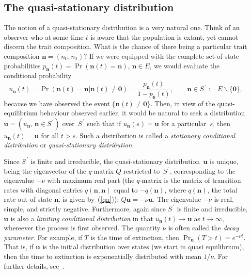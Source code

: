\documentclass[12pt]{article}
\newcommand{\qsd}{quasi-stationary distribution}
\newcommand{\bn}{\boldsymbol{n}}
\newcommand{\bu}{\boldsymbol{u}}
\newcommand{\myprime}{\,\prime}
\newcommand{\bzero}{\boldsymbol{0}}
\begin{document}
\subsection{The {\qsd}}

The notion of a {\qsd} is a very natural one. Think of an observer who
at some time $t$ is aware that the population is extant, yet cannot
discern the trait composition. What is the chance of there being a
particular trait composition $\bn=(n_0,n_1)$? If we were equipped with
the complete set of state probabilities $p_{\bn}(t)=\Pr(\bn(t) =\bn)$,
$\bn\in E$, we would evaluate the conditional probability
$$
u_{\bn}(t)=\Pr(\bn(t) =\bn | \bn(t)\neq \bzero)
= \frac{p_{\bn}(t)}{1-p_{\bzero}(t)},
\qquad
\bn\in S^{\myprime}:=E\backslash \{\bzero\},
$$
because we have observed the event $\{\bn(t) \neq \bzero\}$.
Then, in view of the quasi-equilibrium behaviour observed earlier, it
would be natural to seek a distribution $\bu=(u_{\bn},\, \bn\in
S^{\myprime})$ over~$S^{\myprime}$ such that if $u_{\bn}(s)=\bu$ for a
particular~$s$, then $u_{\bn}(t)=\bu$ for all $t>s$. Such a distribution
is called a {\em stationary conditional distribution\/} or {\em
quasi-stationary distribution\/}.

Since $S^{\myprime}$ is finite and irreducible, the {\qsd}~$\bu$ is
unique, being the eigenvector of the $q$-matrix $Q$ restricted
to~$S^{\myprime}$, corresponding to the eigenvalue $-\nu$ with maximum
real part (the $q$-matrix is the matrix of transition rates with
diagonal entries $q(\bn,\bn)$ equal to $-q(\bn)$, where $q(\bn)$, the
total rate out of state $\bn$, is given by~(\ref{qn})): $Q\bu =-\nu
\bu$. The eigenvalue $-\nu$ is real, simple, and strictly negative.
Furthermore, again since $S^{\myprime}$ is finite and irreducible, $\bu$
is also a {\em limiting conditional distribution\/} in that
$u_{\bn}(t)\to \bu$ as $t\to\infty$, whereever the process is first
observed. The quantity $\nu$ is often called the {\em decay
parameter\/}. For example, if $T$ is the time of extinction, then
$\Pr_{\bu}(T>t)=e^{-\nu t}$. That is, if $\bu$ is the
initial distribution over states (we start in quasi equilibrium),
then the time to extinction is exponentially distributed with mean $1/\nu$.
For further details, see~\cite{vDP12}.
\end{document}

